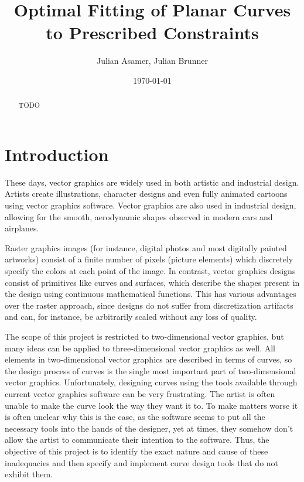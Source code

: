 \documentclass[a4paper]{article}
\title{Optimal Fitting of Planar Curves to Prescribed Constraints}
\author{Julian Asamer, Julian Brunner}
\date{\today}
\begin{document}
	\maketitle

	\begin{abstract}

		\noindent TODO

	\end{abstract}

	\section{Introduction}

		These days, vector graphics are widely used in both artistic and industrial design. Artists create illustrations, character designs and even fully animated cartoons using vector graphics software. Vector graphics are also used in industrial design, allowing for the smooth, aerodynamic shapes observed in modern cars and airplanes.

		Raster graphics images (for instance, digital photos and most digitally painted artworks) consist of a finite number of pixels (picture elements) which discretely specify the colors at each point of the image. In contrast, vector graphics designs consist of primitives like curves and surfaces, which describe the shapes present in the design using continuous mathematical functions. This has various advantages over the raster approach, since designs do not suffer from discretization artifacts and can, for instance, be arbitrarily scaled without any loss of quality.

		The scope of this project is restricted to two-dimensional vector graphics, but many ideas can be applied to three-dimensional vector graphics as well. All elements in two-dimensional vector graphics are described in terms of curves, so the design process of curves is the single most important part of two-dimensional vector graphics. Unfortunately, designing curves using the tools available through current vector graphics software can be very frustrating. The artist is often unable to make the curve look the way they want it to. To make matters worse it is often unclear why this is the case, as the software seems to put all the necessary tools into the hands of the designer, yet at times, they somehow don't allow the artist to communicate their intention to the software. Thus, the objective of this project is to identify the exact nature and cause of these inadequacies and then specify and implement curve design tools that do not exhibit them.
\end{document}
